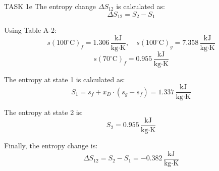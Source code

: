 TASK 1e  
The entropy change \( \Delta S_{12} \) is calculated as:  
\[
\Delta S_{12} = S_2 - S_1
\]

Using Table A-2:  
\[
s(100^\circ \text{C})_f = 1.306 \, \frac{\text{kJ}}{\text{kg·K}}, \quad s(100^\circ \text{C})_g = 7.358 \, \frac{\text{kJ}}{\text{kg·K}}
\]  
\[
s(70^\circ \text{C})_f = 0.955 \, \frac{\text{kJ}}{\text{kg·K}}
\]

The entropy at state 1 is calculated as:  
\[
S_1 = s_f + x_D \cdot (s_g - s_f) = 1.337 \, \frac{\text{kJ}}{\text{kg·K}}
\]

The entropy at state 2 is:  
\[
S_2 = 0.955 \, \frac{\text{kJ}}{\text{kg·K}}
\]

Finally, the entropy change is:  
\[
\Delta S_{12} = S_2 - S_1 = -0.382 \, \frac{\text{kJ}}{\text{kg·K}}
\]